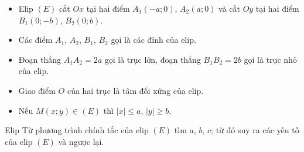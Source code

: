 \begin{note}
		\begin{itemize}
			\item Elip $ (E) $ cắt $ Ox $ tại hai điểm $  A_1(-a; 0) $, $ A_2(a; 0) $ và cắt $ Oy $ tại hai điểm $ B_1(0; -b) $, $ B_2(0; b) $.
			\item Các điểm $ A_1 $, $ A_2 $, $ B_1 $, $ B_2 $ gọi là các đỉnh của elip.
			\item Đoạn thẳng $ A_1A_2 = 2a $ gọi là trục lớn, đoạn thẳng $ B_1B_2 = 2b $ gọi là trục nhỏ của elip.
			\item Giao điểm $ O $ của hai trục là tâm đối xứng của elip.
			\item Nếu $M(x; y) \in (E)$ thì $|x| \leq a$, $|y| \geq b$.
		\end{itemize}
\end{note}
\begin{dang}{Elip}
	Từ phương trình chính tắc của elip $(E)$ tìm $a$, $b$, $c$; từ đó suy ra các yếu tố của elip $(E)$ và ngược lại.
\end{dang}
